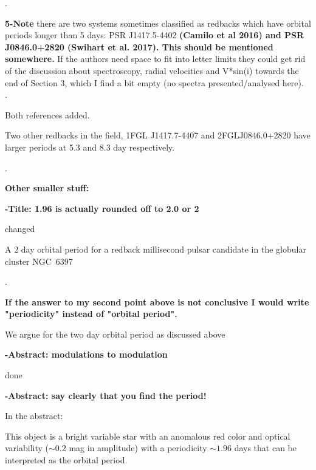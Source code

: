\documentclass{article}
\begin{document}
 \hrulefill. 



\textbf{5-Note} there are  two systems sometimes classified as redbacks which have
 orbital periods longer than 5 days: PSR J1417.5-4402 \textbf{(Camilo et al
 2016) and PSR J0846.0+2820 (Swihart et al. 2017). This should be
 mentioned somewhere.} If the authors need space to fit into letter
 limits they could get rid of the discussion about spectroscopy,
 radial velocities and V*sin(i) towards the end of Section 3, which I
 find a bit empty (no spectra presented/analysed here).\\
 
 \hrulefill. 


Both references added.
\begin{displayquote}
Two other redbacks in the field, 1FGL J1417.7-4407 \citep{Strader2015,Camilo2016,Swihart2018} and 2FGLJ0846.0+2820 \citep{Swihart2017} have larger periods at 5.3 and 8.3 day respectively.
\end{displayquote}
 \hrulefill. 




\textbf{Other smaller stuff:}


\textbf{-Title: 1.96 is actually rounded off to 2.0 or 2}

\hrulefill

changed
\begin{displayquote}
A 2 day orbital period for a redback millisecond pulsar candidate in the globular cluster NGC~6397
\end{displayquote}

 \hrulefill. 


\textbf{If the answer to my second point above is not conclusive I
would write "periodicity" instead of "orbital period".}


 \hrulefill

We argue for the two day orbital period as discussed above

 \hrulefill



\textbf{-Abstract: modulations to modulation}

 \hrulefill

done 


 \hrulefill


\textbf{-Abstract: say clearly that you find the period!}
 
  \hrulefill
  
  In the abstract:
  \begin{displayquote}
  This object is a bright variable star with an anomalous red color and optical variability ($\sim0.2$ mag in amplitude) with a periodicity $\sim 1.96$ days that can be interpreted as the orbital period. 
  \end{displayquote}
\end{document}
